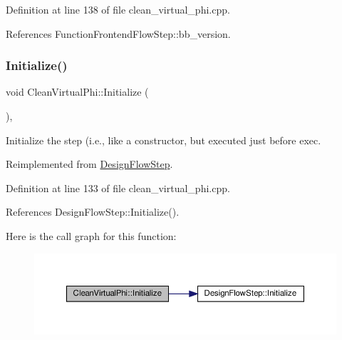 Definition at line 138 of file clean\+\_\+virtual\+\_\+phi.\+cpp.



References Function\+Frontend\+Flow\+Step\+::bb\+\_\+version.

\mbox{\label{classCleanVirtualPhi_a591498af926bbd5368338f97c45c5e2a}} 
\subsubsection{\texorpdfstring{Initialize()}{Initialize()}}
{\footnotesize\ttfamily void Clean\+Virtual\+Phi\+::\+Initialize (\begin{DoxyParamCaption}{ }\end{DoxyParamCaption})\hspace{0.3cm}{\ttfamily [override]}, {\ttfamily [virtual]}}



Initialize the step (i.\+e., like a constructor, but executed just before exec. 



Reimplemented from \hyperlink{classDesignFlowStep_a44b50683382a094976e1d432a7784799}{Design\+Flow\+Step}.



Definition at line 133 of file clean\+\_\+virtual\+\_\+phi.\+cpp.



References Design\+Flow\+Step\+::\+Initialize().

Here is the call graph for this function\+:
\nopagebreak
\begin{figure}[H]
\begin{center}
\leavevmode
\includegraphics[width=350pt]{db/d8c/classCleanVirtualPhi_a591498af926bbd5368338f97c45c5e2a_cgraph}
\end{center}
\end{figure}
\mbox{\label{classCleanVirtualPhi_aa42a723e56786320db6ba7539aa719ab}} 
